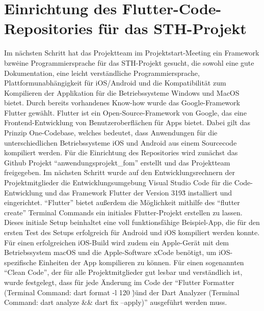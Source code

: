 \section{Einrichtung des Flutter-Code-Repositories für das STH-Projekt}
Im nächsten Schritt hat das Projektteam im Projektstart-Meeting ein Framework bzw\. eine Programmiersprache für das STH-Projekt gesucht, die sowohl eine gute Dokumentation, eine leicht verständliche Programmiersprache, Plattformunabhängigkeit für iOS/Android und die Kompatibilität zum Kompilieren der Applikation für die Betriebssysteme Windows und MacOS bietet.
Durch bereits vorhandenes Know-how wurde das Google-Framework Flutter gewählt.\newline
Flutter ist ein Open-Source-Framework von Google, das eine Frontend-Entwicklung von Benutzeroberflächen für Apps bietet.
Dabei gilt das Prinzip One-Codebase, welches bedeutet, dass Anwendungen für die unterschiedlichen Betriebssysteme iOS und Android aus einem Sourcecode kompiliert werden.
\newline
Für die Einrichtung des Repositories wird zunächst das Github Projekt ``anwendungsprojekt\_fom'' erstellt und das Projektteam freigegeben.
Im nächsten Schritt wurde auf den Entwicklungsrechnern der Projektmitglieder die Entwicklungsumgebung Visual Studio Code für die Code-Entwicklung und das Framework Flutter der Version 3\.19\.3 installiert und eingerichtet.
``Flutter'' bietet außerdem die Möglichkeit mithilfe des ``flutter create'' Terminal Commands ein initiales Flutter-Projekt erstellen zu lassen.
Dieses initiale Setup beinhaltet eine voll funktionsfähige Beispiel-App, die für den ersten Test des Setups erfolgreich für Android und iOS kompiliert werden konnte.
Für einen erfolgreichen iOS-Build wird zudem ein Apple-Gerät mit dem Betriebssystem macOS und die Apple-Software xCode benötigt, um iOS-spezifische Einheiten der App kompilieren zu können.
\newline
Für einen sogenannten ``Clean Code'', der für alle Projektmitglieder gut lesbar und verständlich ist, wurde festgelegt, dass für jede Änderung im Code der ``Flutter Formatter (Terminal Command: dart format -l 120 \.)\" und der Dart Analyzer (Terminal Command: dart analyze \&\& dart fix --apply)'' ausgeführt werden muss.
